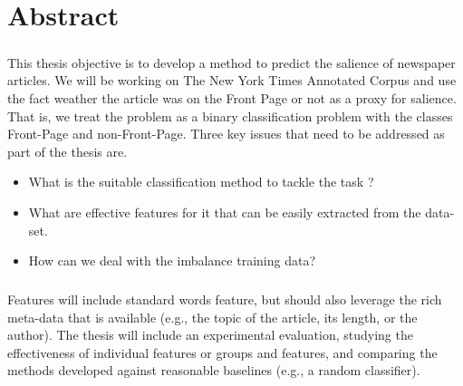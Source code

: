 \chapter*{Abstract}
\paragraph*{}
This thesis objective is to develop a method to predict the salience of newspaper articles. We will be working on The New York Times Annotated Corpus and use the fact weather the article was on the Front Page or not as a proxy for salience. That is, we treat the problem as a binary classification problem with the classes Front-Page and non-Front-Page. Three key issues that need to be addressed as part of the thesis are.

\begin{itemize}
\item What is the suitable classification method to tackle the task ?
\item What are effective features for it that can be easily extracted from the data-set.
\item How can we deal with the imbalance training data?
\end{itemize}

\paragraph*{}
Features will include standard words feature, but should also leverage the rich meta-data that is available (e.g., the topic of the article, its length, or the author). The thesis will include an experimental evaluation, studying the effectiveness of individual features or groups and features, and comparing the methods developed against reasonable baselines (e.g., a random classifier).
